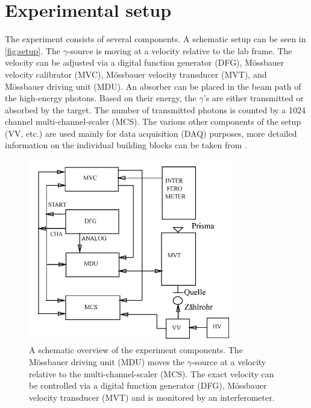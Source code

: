 
\section{Experimental setup}
\label{sec:setup}

The experiment consists of several components. A schematic setup can be seen in 
\autoref{fig:setup}. The $\gamma$-source is moving at a velocity relative to the lab 
frame. The velocity can be adjusted via a digital function generator (DFG), 
Mössbauer velocity calibrator (MVC), Mössbauer velocity transducer (MVT), and 
Mössbauer driving unit (MDU). An absorber can be placed in the beam path of the 
high-energy photons. Based on their energy, the $\gamma$'s are either transmitted or 
absorbed by the target. The number of transmitted photons is counted by a 1024 
channel multi-channel-scaler (MCS). The various other components of the setup (VV, 
etc.) are used mainly for data acquisition (DAQ) purposes, more detailed information 
on the individual building blocks can be taken from \cite{Sch17}.

\begin{figure}[h]
	\centering
	\label{fig:setup}
	\includegraphics[width=0.8\textwidth]{./fig/setup.png}
	\caption{A schematic overview of the experiment components. The Mössbauer 
	driving unit (MDU) moves the $\gamma$-source at a velocity relative to the 
	multi-channel-scaler (MCS). The exact velocity can be controlled via a 
	digital function generator (DFG), Mössbauer velocity transducer (MVT) and is 
	monitored by an interferometer.}
\end{figure}
